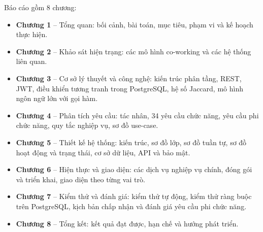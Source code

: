 \vspace{0.3cm}
\noindent Báo cáo gồm 8 chương:
\begin{itemize}
    \item \textbf{Chương 1} -- Tổng quan: bối cảnh, bài toán, mục tiêu, phạm vi và kế hoạch thực hiện.
    \item \textbf{Chương 2} -- Khảo sát hiện trạng: các mô hình co-working và các hệ thống liên quan.
    \item \textbf{Chương 3} -- Cơ sở lý thuyết và công nghệ: kiến trúc phân tầng, REST, JWT, điều khiển tương tranh trong PostgreSQL, hệ số Jaccard, mô hình ngôn ngữ lớn với gọi hàm.
    \item \textbf{Chương 4} -- Phân tích yêu cầu: tác nhân, 34 yêu cầu chức năng, yêu cầu phi chức năng, quy tắc nghiệp vụ, sơ đồ use-case.
    \item \textbf{Chương 5} -- Thiết kế hệ thống: kiến trúc, sơ đồ lớp, sơ đồ tuần tự, sơ đồ hoạt động và trạng thái, cơ sở dữ liệu, API và bảo mật.
    \item \textbf{Chương 6} -- Hiện thực và giao diện: các dịch vụ nghiệp vụ chính, đóng gói và triển khai, giao diện theo từng vai trò.
    \item \textbf{Chương 7} -- Kiểm thử và đánh giá: kiểm thử tự động, kiểm thử ràng buộc trên PostgreSQL, kịch bản chấp nhận và đánh giá yêu cầu phi chức năng.
    \item \textbf{Chương 8} -- Tổng kết: kết quả đạt được, hạn chế và hướng phát triển.
\end{itemize}
